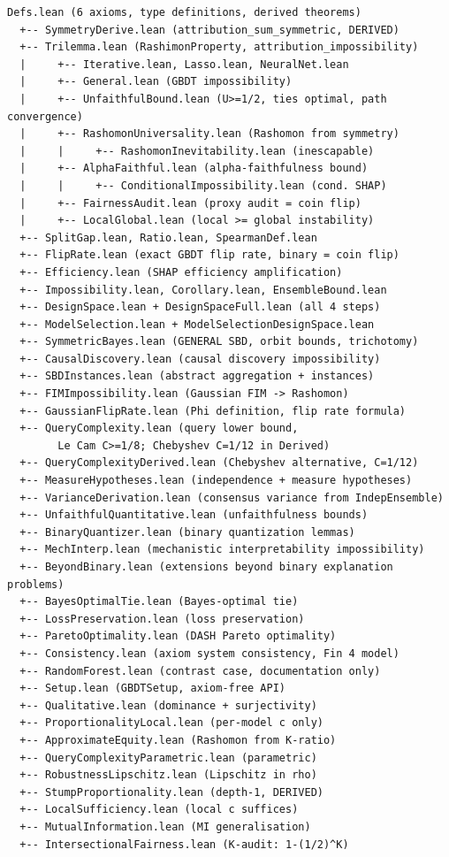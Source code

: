 \documentclass{article}
\begin{document}
\begin{verbatim}
Defs.lean (6 axioms, type definitions, derived theorems)
  +-- SymmetryDerive.lean (attribution_sum_symmetric, DERIVED)
  +-- Trilemma.lean (RashimonProperty, attribution_impossibility)
  |     +-- Iterative.lean, Lasso.lean, NeuralNet.lean
  |     +-- General.lean (GBDT impossibility)
  |     +-- UnfaithfulBound.lean (U>=1/2, ties optimal, path convergence)
  |     +-- RashomonUniversality.lean (Rashomon from symmetry)
  |     |     +-- RashomonInevitability.lean (inescapable)
  |     +-- AlphaFaithful.lean (alpha-faithfulness bound)
  |     |     +-- ConditionalImpossibility.lean (cond. SHAP)
  |     +-- FairnessAudit.lean (proxy audit = coin flip)
  |     +-- LocalGlobal.lean (local >= global instability)
  +-- SplitGap.lean, Ratio.lean, SpearmanDef.lean
  +-- FlipRate.lean (exact GBDT flip rate, binary = coin flip)
  +-- Efficiency.lean (SHAP efficiency amplification)
  +-- Impossibility.lean, Corollary.lean, EnsembleBound.lean
  +-- DesignSpace.lean + DesignSpaceFull.lean (all 4 steps)
  +-- ModelSelection.lean + ModelSelectionDesignSpace.lean
  +-- SymmetricBayes.lean (GENERAL SBD, orbit bounds, trichotomy)
  +-- CausalDiscovery.lean (causal discovery impossibility)
  +-- SBDInstances.lean (abstract aggregation + instances)
  +-- FIMImpossibility.lean (Gaussian FIM -> Rashomon)
  +-- GaussianFlipRate.lean (Phi definition, flip rate formula)
  +-- QueryComplexity.lean (query lower bound,
        Le Cam C>=1/8; Chebyshev C=1/12 in Derived)
  +-- QueryComplexityDerived.lean (Chebyshev alternative, C=1/12)
  +-- MeasureHypotheses.lean (independence + measure hypotheses)
  +-- VarianceDerivation.lean (consensus variance from IndepEnsemble)
  +-- UnfaithfulQuantitative.lean (unfaithfulness bounds)
  +-- BinaryQuantizer.lean (binary quantization lemmas)
  +-- MechInterp.lean (mechanistic interpretability impossibility)
  +-- BeyondBinary.lean (extensions beyond binary explanation problems)
  +-- BayesOptimalTie.lean (Bayes-optimal tie)
  +-- LossPreservation.lean (loss preservation)
  +-- ParetoOptimality.lean (DASH Pareto optimality)
  +-- Consistency.lean (axiom system consistency, Fin 4 model)
  +-- RandomForest.lean (contrast case, documentation only)
  +-- Setup.lean (GBDTSetup, axiom-free API)
  +-- Qualitative.lean (dominance + surjectivity)
  +-- ProportionalityLocal.lean (per-model c only)
  +-- ApproximateEquity.lean (Rashomon from K-ratio)
  +-- QueryComplexityParametric.lean (parametric)
  +-- RobustnessLipschitz.lean (Lipschitz in rho)
  +-- StumpProportionality.lean (depth-1, DERIVED)
  +-- LocalSufficiency.lean (local c suffices)
  +-- MutualInformation.lean (MI generalisation)
  +-- IntersectionalFairness.lean (K-audit: 1-(1/2)^K)
\end{verbatim}
\end{document}
